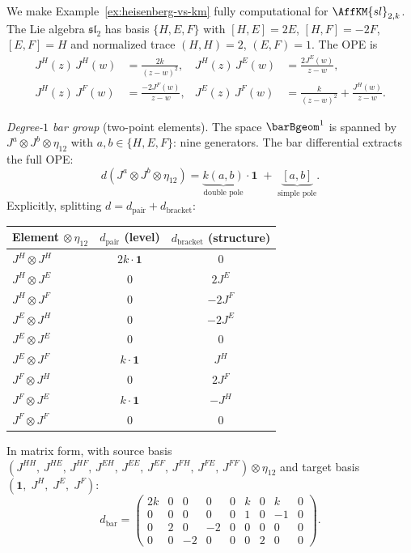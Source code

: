 \begin{example}
\label{ex:sl2-bar-matrix}

We make Example~\ref{ex:heisenberg-vs-km} fully computational for
$\AffKM{sl}_{2,k}$. The Lie algebra $\mathfrak{sl}_2$ has basis
$\{H, E, F\}$ with $[H, E] = 2E$, $[H, F] = -2F$, $[E, F] = H$
and normalized trace $(H, H) = 2$, $(E, F) = 1$. The OPE is
\begin{align*}
J^H(z)\, J^H(w) &= \frac{2k}{(z-w)^2}, &
J^H(z)\, J^E(w) &= \frac{2J^E(w)}{z-w}, \\
J^H(z)\, J^F(w) &= \frac{-2J^F(w)}{z-w}, &
J^E(z)\, J^F(w) &= \frac{k}{(z-w)^2} + \frac{J^H(w)}{z-w}.
\end{align*}

\emph{Degree-$1$ bar group} (two-point elements).
The space $\barBgeom^1$ is spanned by
$J^a \otimes J^b \otimes \eta_{12}$ with
$a, b \in \{H, E, F\}$: nine generators. The bar differential
extracts the full OPE:
\[
d(J^a \otimes J^b \otimes \eta_{12})
= \underbrace{k(a,b)}_{\text{double pole}} \cdot \mathbf{1}
 \;+\; \underbrace{[a,b]}_{\text{simple pole}}.
\]
Explicitly, splitting $d = d_{\mathrm{pair}} + d_{\mathrm{bracket}}$:

\medskip
\begin{center}
\small
\renewcommand{\arraystretch}{1.2}
\begin{tabular}{@{}l@{\;\;\;}c@{\;\;\;}c@{}}
\hline
Element $\otimes\, \eta_{12}$ & $d_{\mathrm{pair}}$ (level)
 & $d_{\mathrm{bracket}}$ (structure) \\
\hline
$J^H \otimes J^H$ & $2k \cdot \mathbf{1}$ & $0$ \\
$J^H \otimes J^E$ & $0$ & $2J^E$ \\
$J^H \otimes J^F$ & $0$ & $-2J^F$ \\
$J^E \otimes J^H$ & $0$ & $-2J^E$ \\
$J^E \otimes J^E$ & $0$ & $0$ \\
$J^E \otimes J^F$ & $k \cdot \mathbf{1}$ & $J^H$ \\
$J^F \otimes J^H$ & $0$ & $2J^F$ \\
$J^F \otimes J^E$ & $k \cdot \mathbf{1}$ & $-J^H$ \\
$J^F \otimes J^F$ & $0$ & $0$ \\
\hline
\end{tabular}
\end{center}
\medskip

In matrix form, with source basis
$(J^{HH},\, J^{HE},\, J^{HF},\, J^{EH},\, J^{EE},\, J^{EF},\,
J^{FH},\, J^{FE},\, J^{FF}) \otimes \eta_{12}$
and target basis
$(\mathbf{1},\; J^H,\; J^E,\; J^F)$:
\begin{equation}\label{eq:sl2-bar-matrix-fourier}
d_{\mathrm{bar}}
= \begin{pmatrix}
2k & 0 & 0 & 0 & 0 & k & 0 & k & 0 \\
0 & 0 & 0 & 0 & 0 & 1 & 0 & -1 & 0 \\
0 & 2 & 0 & -2 & 0 & 0 & 0 & 0 & 0 \\
0 & 0 & -2 & 0 & 0 & 0 & 2 & 0 & 0
\end{pmatrix}.
\end{equation}


\end{example}

